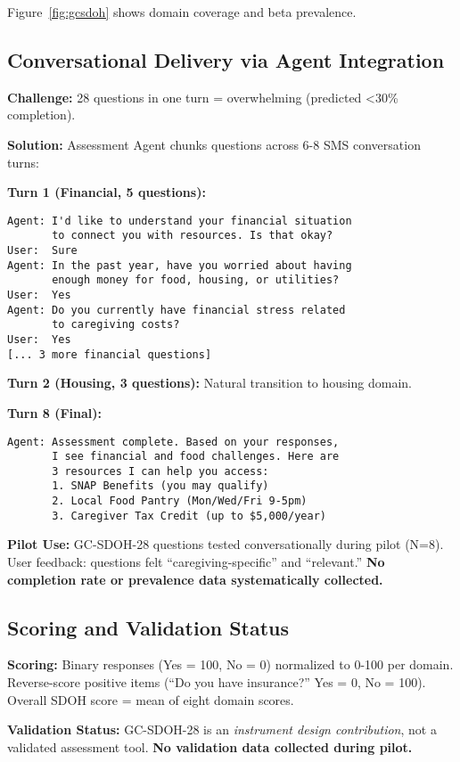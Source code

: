 \documentclass{article}
\begin{document}
Figure~\ref{fig:gcsdoh} shows domain coverage and beta prevalence.

%
\subsection{Conversational Delivery via Agent Integration}%
\label{subsec:ConversationalDeliveryviaAgentIntegration}%
\textbf{Challenge:} 28 questions in one turn = overwhelming (predicted <30\% completion).

\textbf{Solution:} Assessment Agent chunks questions across 6-8 SMS conversation turns:

\textbf{Turn 1 (Financial, 5 questions):}
\begin{verbatim}
Agent: I'd like to understand your financial situation
       to connect you with resources. Is that okay?
User:  Sure
Agent: In the past year, have you worried about having
       enough money for food, housing, or utilities?
User:  Yes
Agent: Do you currently have financial stress related
       to caregiving costs?
User:  Yes
[... 3 more financial questions]
\end{verbatim}

\textbf{Turn 2 (Housing, 3 questions):} Natural transition to housing domain.

\textbf{Turn 8 (Final):}
\begin{verbatim}
Agent: Assessment complete. Based on your responses,
       I see financial and food challenges. Here are
       3 resources I can help you access:
       1. SNAP Benefits (you may qualify)
       2. Local Food Pantry (Mon/Wed/Fri 9-5pm)
       3. Caregiver Tax Credit (up to $5,000/year)
\end{verbatim}

\textbf{Pilot Use:} GC-SDOH-28 questions tested conversationally during pilot (N=8). User feedback: questions felt ``caregiving-specific'' and ``relevant.'' \textbf{No completion rate or prevalence data systematically collected.}

%
\subsection{Scoring and Validation Status}%
\label{subsec:ScoringandConvergentValidity}%
\textbf{Scoring:} Binary responses (Yes = 100, No = 0) normalized to 0-100 per domain. Reverse-score positive items (``Do you have insurance?'' Yes = 0, No = 100). Overall SDOH score = mean of eight domain scores.

\textbf{Validation Status:} GC-SDOH-28 is an \textit{instrument design contribution}, not a validated assessment tool. \textbf{No validation data collected during pilot.}
\end{document}
